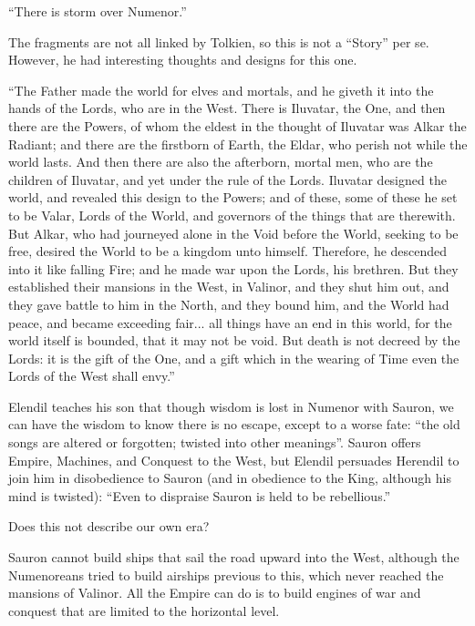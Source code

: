 ``There is storm over Numenor.''

The fragments are not all linked by Tolkien, so this is not a ``Story'' per se. However, he had interesting thoughts and designs for this one.

\begin{quotex}
``The Father made the world for elves and mortals, and he giveth it into the hands of the Lords, who are in the West. There is Iluvatar, the One, and then there are the Powers, of whom the eldest in the thought of Iluvatar was Alkar the Radiant; and there are the firstborn of Earth, the Eldar, who perish not while the world lasts. And then there are also the afterborn, mortal men, who are the children of Iluvatar, and yet under the rule of the Lords. Iluvatar designed the world, and revealed this design to the Powers; and of these, some of these he set to be Valar, Lords of the World, and governors of the things that are therewith. But Alkar, who had journeyed alone in the Void before the World, seeking to be free, desired the World to be a kingdom unto himself. Therefore, he descended into it like falling Fire; and he made war upon the Lords, his brethren. But they established their mansions in the West, in Valinor, and they shut him out, and they gave battle to him in the North, and they bound him, and the World had peace, and became exceeding fair... all things have an end in this world, for the world itself is bounded, that it may not be void. But death is not decreed by the Lords: it is the gift of the One, and a gift which in the wearing of Time even the Lords of the West shall envy.''
\end{quotex}


Elendil teaches his son that though wisdom is lost in Numenor with Sauron, we can have the wisdom to know there is no escape, except to a worse fate: ``the old songs are altered or forgotten; twisted into other meanings''. Sauron offers Empire, Machines, and Conquest to the West, but Elendil persuades Herendil to join him in disobedience to Sauron (and in obedience to the King, although his mind is twisted): ``Even to dispraise Sauron is held to be rebellious.''

Does this not describe our own era?

Sauron cannot build ships that sail the road upward into the West, although the Numenoreans tried to build airships previous to this, which never reached the mansions of Valinor. All the Empire can do is to build engines of war and conquest that are limited to the horizontal level.

